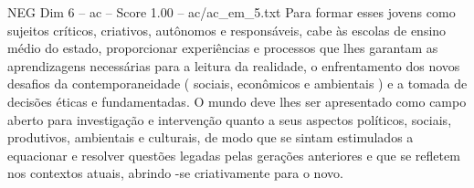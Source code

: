 \begin{textsample}{NEG Dim 6 – ac – Score 1.00 – ac/ac\_em\_5.txt}
Para formar esses jovens como sujeitos críticos, criativos, autônomos e responsáveis, cabe às escolas de ensino médio do estado, proporcionar experiências e processos que lhes garantam as aprendizagens necessárias para a leitura da realidade, o enfrentamento dos novos desafios da contemporaneidade ( sociais, econômicos e ambientais ) e a tomada de decisões éticas e fundamentadas.
O mundo deve lhes ser apresentado como campo aberto para investigação e intervenção quanto a seus aspectos políticos, sociais, produtivos, ambientais e culturais, de modo que se sintam estimulados a equacionar e resolver questões legadas pelas gerações anteriores e que se refletem nos contextos atuais, abrindo -se criativamente para o novo.

\end{textsample}
